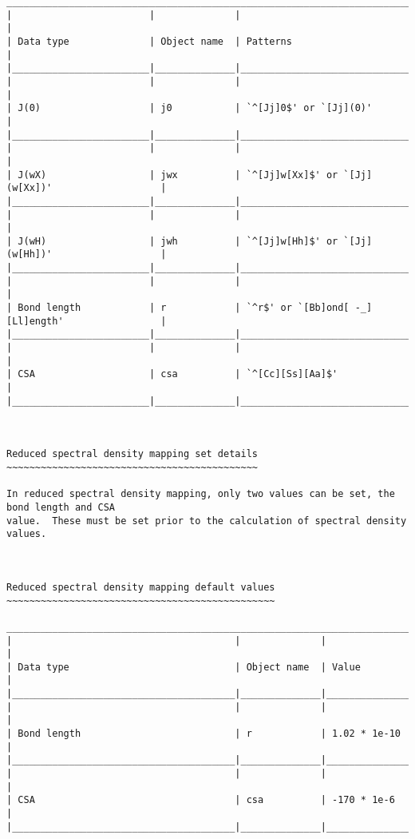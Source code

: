 {\begin{verbatim}
____________________________________________________________________________________________
|                        |              |                                                  |
| Data type              | Object name  | Patterns                                         |
|________________________|______________|__________________________________________________|
|                        |              |                                                  |
| J(0)                   | j0           | `^[Jj]0$' or `[Jj](0)'                           |
|________________________|______________|__________________________________________________|
|                        |              |                                                  |
| J(wX)                  | jwx          | `^[Jj]w[Xx]$' or `[Jj](w[Xx])'                   |
|________________________|______________|__________________________________________________|
|                        |              |                                                  |
| J(wH)                  | jwh          | `^[Jj]w[Hh]$' or `[Jj](w[Hh])'                   |
|________________________|______________|__________________________________________________|
|                        |              |                                                  |
| Bond length            | r            | `^r$' or `[Bb]ond[ -_][Ll]ength'                 |
|________________________|______________|__________________________________________________|
|                        |              |                                                  |
| CSA                    | csa          | `^[Cc][Ss][Aa]$'                                 |
|________________________|______________|__________________________________________________|



Reduced spectral density mapping set details
~~~~~~~~~~~~~~~~~~~~~~~~~~~~~~~~~~~~~~~~~~~~

In reduced spectral density mapping, only two values can be set, the bond length and CSA
value.  These must be set prior to the calculation of spectral density values.



Reduced spectral density mapping default values
~~~~~~~~~~~~~~~~~~~~~~~~~~~~~~~~~~~~~~~~~~~~~~~

_______________________________________________________________________________________
|                                       |              |                              |
| Data type                             | Object name  | Value                        |
|_______________________________________|______________|______________________________|
|                                       |              |                              |
| Bond length                           | r            | 1.02 * 1e-10                 |
|_______________________________________|______________|______________________________|
|                                       |              |                              |
| CSA                                   | csa          | -170 * 1e-6                  |
|_______________________________________|______________|______________________________|
\end{verbatim}
}
